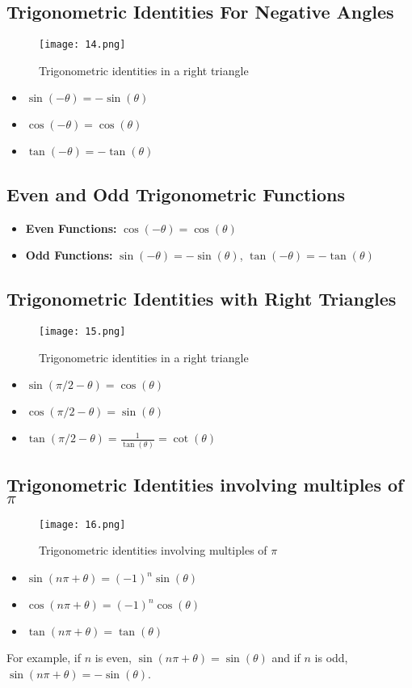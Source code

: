\subsection{Trigonometric Identities For Negative Angles}
\begin{figure}
    \centering
    \texttt{[image: 14.png]}
    \caption{Trigonometric identities in a right triangle}
\end{figure}
\begin{itemize}
    \item $\sin(-\theta) = -\sin(\theta)$
    \item $\cos(-\theta) = \cos(\theta)$
    \item $\tan(-\theta) = -\tan(\theta)$
\end{itemize}

\subsection{Even and Odd Trigonometric Functions}
\begin{itemize}
    \item \textbf{Even Functions:} $\cos(-\theta) = \cos(\theta)$
    \item \textbf{Odd Functions:} $\sin(-\theta) = -\sin(\theta)$, $\tan(-\theta) = -\tan(\theta) $
\end{itemize}

\subsection{Trigonometric Identities with Right Triangles}
\begin{figure}
    \centering
    \texttt{[image: 15.png]}
    \caption{Trigonometric identities in a right triangle}
\end{figure}
\begin{itemize}
    \item  $\sin(\pi/2 - \theta) = \cos(\theta)$
    \item $\cos(\pi/2 - \theta) = \sin(\theta)$
    \item $\tan(\pi/2 - \theta) = \frac{1}{\tan(\theta)} = \cot(\theta)$
\end{itemize}

\subsection{Trigonometric Identities involving multiples of $\pi$}
\begin{figure}
    \centering
    \texttt{[image: 16.png]}
    \caption{Trigonometric identities involving multiples of $\pi$}
\end{figure}
\begin{itemize}
    \item $\sin(n\pi + \theta) = (-1)^n \sin(\theta)$
    \item $\cos(n\pi + \theta) = (-1)^n \cos(\theta)$
    \item $\tan(n\pi + \theta) = \tan(\theta)$
\end{itemize}
For example, if $n$ is even, $\sin(n\pi + \theta) = \sin(\theta)$ and if $n$ is odd, $\sin(n\pi + \theta) = -\sin(\theta)$.

